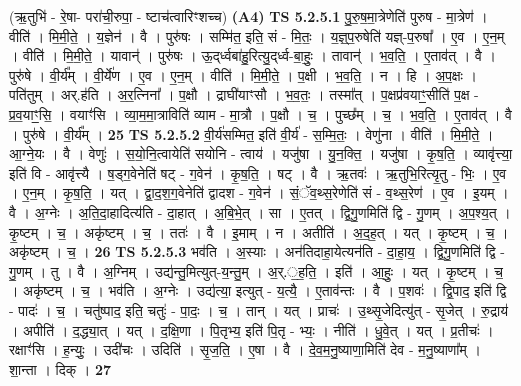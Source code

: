 \documentclass[17pt]{extarticle}
\begin{document}
                  \newline
                      (ऋ॒तुभि॑ - रे॒षा- परा॑ची॒रुपा॒ - ष्टाच॑त्वारिꣳशच्च)  \textbf{(A4)} \newline \newline
                                \textbf{ TS 5.2.5.1} \newline
                  पु॒रु॒ष॒मा॒त्रेणेति॑ पुरुष - मा॒त्रेण॑ । वीति॑ । मि॒मी॒ते॒ । य॒ज्ञेन॑ । वै । पुरु॑षः । सम्मि॑त॒ इति॒ सं - मि॒तः॒ । य॒ज्ञ्॒प॒रुषेति॑ यज्ञ्-प॒रुषा᳚ । ए॒व । ए॒न॒म् । वीति॑ । मि॒मी॒ते॒ । यावान्॑ । पुरु॑षः । ऊ॒द्‌र्ध्वबा॑हु॒रित्यु॒द्‌र्ध्व-बा॒हुः॒ । तावान्॑ । भ॒व॒ति॒ । ए॒ताव॑त् । वै । पुरु॑षे । वी॒र्य᳚म् । वी॒र्ये॑ण । ए॒व । ए॒न॒म् । वीति॑ । मि॒मी॒ते॒ । प॒क्षी । भ॒व॒ति॒ । न । हि । अ॒प॒क्षः । पति॑तुम् । अर्.ह॑ति । अ॒र॒त्निना᳚ । प॒क्षौ । द्राघी॑याꣳसौ । भ॒व॒तः॒ । तस्मा᳚त् । प॒क्षप्र॑वयाꣳ॒॒सीति॑ प॒क्ष - प्र॒व॒याꣳ॒॒सि॒ । वयाꣳ॑सि । व्या॒म॒मा॒त्राविति॑ व्याम - मा॒त्रौ । प॒क्षौ । च॒ । पुच्छ᳚म् । च॒ । भ॒व॒ति॒ । ए॒ताव॑त् । वै । पुरु॑षे । वी॒र्य᳚म् । \textbf{  25} \newline
                  \newline
                                \textbf{ TS 5.2.5.2} \newline
                  वी॒र्य॑सम्मित॒ इति॑ वी॒र्य॑ - स॒म्मि॒तः॒ । वेणु॑ना । वीति॑ । मि॒मी॒ते॒ । आ॒ग्ने॒यः । वै । वेणुः॑ । स॒यो॒नि॒त्वायेति॑ सयोनि - त्वाय॑ । यजु॑षा । यु॒न॒क्ति॒ । यजु॑षा । कृ॒ष॒ति॒ । व्यावृ॑त्त्या॒ इति॑ वि - आवृ॑त्त्यै । ष॒ड्ग॒वेनेति॑ षट् - ग॒वेन॑ । कृ॒ष॒ति॒ । षट् । वै । ऋ॒तवः॑ । ऋ॒तुभि॒रित्यृ॒तु - भिः॒ । ए॒व । ए॒न॒म् । कृ॒ष॒ति॒ । यत् । द्वा॒द॒श॒ग॒वेनेति॑ द्वादश - ग॒वेन॑ । सं॒ॅव॒थ्स॒रेणेति॑ सं - व॒थ्स॒रेण॑ । ए॒व । इ॒यम् । वै । अ॒ग्नेः । अ॒ति॒दा॒हादित्य॑ति - दा॒हात् । अ॒बि॒भे॒त् । सा । ए॒तत् । द्वि॒गु॒णमिति॑ द्वि - गु॒णम् । अ॒प॒श्य॒त् । कृ॒ष्टम् । च॒ । अकृ॑ष्टम् । च॒ । ततः॑ । वै । इ॒माम् । न । अतीति॑ । अ॒द॒ह॒त् । यत् । कृ॒ष्टम् । च॒ । अकृ॑ष्टम् । च॒ । \textbf{  26} \newline
                  \newline
                                \textbf{ TS 5.2.5.3} \newline
                  भव॑ति । अ॒स्याः । अन॑तिदाहा॒येत्यन॑ति - दा॒हा॒य॒ । द्वि॒गु॒णमिति॑ द्वि - गु॒णम् । तु । वै । अ॒ग्निम् । उद्य॑न्तु॒मित्युत्-य॒न्तु॒म् । अ॒र्.॒ह॒ति॒ । इति॑ । आ॒हुः॒ । यत् । कृ॒ष्टम् । च॒ । अकृ॑ष्टम् । च॒ । भव॑ति । अ॒ग्नेः । उद्य॑त्या॒ इत्युत् - य॒त्यै॒ । ए॒ताव॑न्तः । वै । प॒शवः॑ । द्वि॒पाद॒ इति॑ द्वि - पादः॑ । च॒ । चतु॑ष्पाद॒ इति॒ चतुः॑ - पा॒दः॒ । च॒ । तान् । यत् । प्राचः॑ । उ॒थ्सृ॒जेदित्यु॑त् - सृ॒जेत् । रु॒द्राय॑ । अपीति॑ । द॒द्ध्या॒त् । यत् । द॒क्षि॒णा । पि॒तृभ्य॒ इति॑ पि॒तृ - भ्यः॒ । नीति॑ । धु॒वे॒त् । यत् । प्र॒तीचः॑ । रक्षाꣳ॑सि । ह॒न्युः॒ । उदी॑चः । उदिति॑ । सृ॒ज॒ति॒ । ए॒षा । वै । दे॒व॒म॒नु॒ष्याणा॒मिति॑ देव - म॒नु॒ष्याणा᳚म् । शा॒न्ता । दिक् । \textbf{  27} \newline
\end{document}
